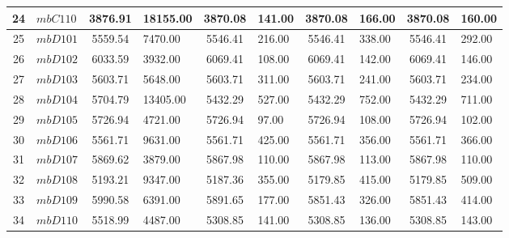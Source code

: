 \documentclass[a4paper,12pt]{report}
\begin{document}
\begin{longtable}{|c|l|c|p{1.5cm}|c|p{1cm}|c|p{1cm}|c|p{1cm}|}
24&$mbC110$ &    3876.91 &  18155.00 &    3870.08 &     141.00 &    3870.08 &     166.00 &    3870.08 &     160.00\\ \hline 
25&$mbD101$ &    5559.54 &   7470.00 &    5546.41 &     216.00 &    5546.41 &     338.00 &    5546.41 &     292.00\\ \hline 
26&$mbD102$ &    6033.59 &   3932.00 &    6069.41 &     108.00 &    6069.41 &     142.00 &    6069.41 &     146.00\\ \hline 
27&$mbD103$ &    5603.71 &   5648.00 &    5603.71 &     311.00 &    5603.71 &     241.00 &    5603.71 &     234.00\\ \hline 
28&$mbD104$ &    5704.79 &  13405.00 &    5432.29 &     527.00 &    5432.29 &     752.00 &    5432.29 &     711.00\\ \hline 
29&$mbD105$ &    5726.94 &   4721.00 &    5726.94 &      97.00 &    5726.94 &     108.00 &    5726.94 &     102.00\\ \hline 
30&$mbD106$ &    5561.71 &   9631.00 &    5561.71 &     425.00 &    5561.71 &     356.00 &    5561.71 &     366.00\\ \hline 
31&$mbD107$ &    5869.62 &   3879.00 &    5867.98 &     110.00 &    5867.98 &     113.00 &    5867.98 &     110.00\\ \hline 
32&$mbD108$ &    5193.21 &   9347.00 &    5187.36 &     355.00 &    5179.85 &     415.00 &    5179.85 &     509.00\\ \hline 
33&$mbD109$ &    5990.58 &   6391.00 &    5891.65 &     177.00 &    5851.43 &     326.00 &    5851.43 &     414.00\\ \hline 
34&$mbD110$ &    5518.99 &   4487.00 &    5308.85 &     141.00 &    5308.85 &     136.00 &    5308.85 &     143.00\\ \hline 

\end{longtable}
\normalsize
\end{document}
